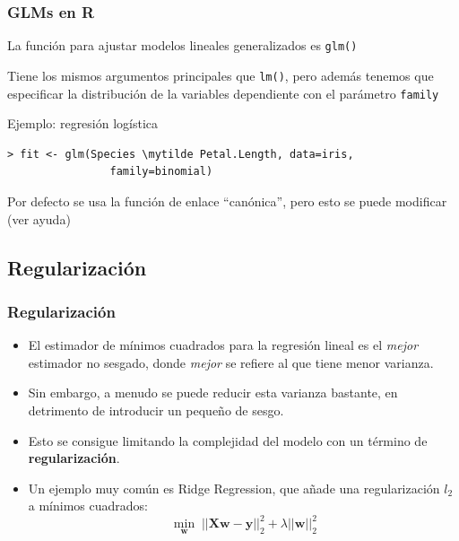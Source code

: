 \documentclass{beamer}
\newcommand{\mytilde}{$\sim$}
\newcommand{\Xbf}{\ensuremath{\mathbf{X}}}
\newcommand{\wbf}{\ensuremath{\mathbf{w}}}
\newcommand{\ybf}{\ensuremath{\mathbf{y}}}
\newenvironment{wideitemize}{\itemize\addtolength{\itemsep}{12pt}}{\enditemize}
\begin{document}
\begin{frame}[fragile]
\frametitle{GLMs en R}
\begin{wideitemize}
\item La función para ajustar modelos lineales generalizados es \texttt{glm()}
\item Tiene los mismos argumentos principales que \texttt{lm()}, pero además tenemos que especificar la distribución de la variables dependiente con el parámetro \texttt{family}
\item Ejemplo: regresión logística

\begin{Verbatim}[commandchars=\\\{\}]
   > fit <- glm(Species \mytilde Petal.Length, data=iris, 
                family=binomial)
\end{Verbatim}
\item Por defecto se usa la función de enlace ``canónica'', pero esto se puede modificar (ver ayuda)
\end{wideitemize}
\end{frame}


\subsection{Regularización}

\begin{frame}
\frametitle{Regularización}

\begin{itemize}
\item El estimador de mínimos cuadrados para la regresión lineal es el \textit{mejor} estimador no sesgado, donde \textit{mejor} se refiere al que tiene menor varianza.

\item Sin embargo, a menudo se puede reducir esta varianza bastante, en detrimento de introducir un pequeño de sesgo.

\item Esto se consigue limitando la complejidad del modelo con un término de \textbf{regularización}.

\item Un ejemplo muy común es Ridge Regression, que añade una regularización $l_2$ a mínimos cuadrados:
$$\min_\wbf\;||\Xbf\wbf - \ybf||^2_2 + \lambda||\wbf||^2_2$$

\end{itemize}
\end{frame}
\end{document}
